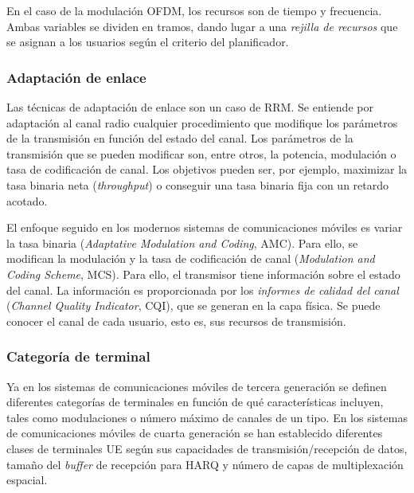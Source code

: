 \documentclass[12pt]{report} %
\begin{document}
En el caso de la modulación OFDM, los recursos son de tiempo y frecuencia.
Ambas variables se dividen en tramos, dando lugar a una \textit{rejilla de recursos} que se asignan a los usuarios según el criterio del planificador.
\cite{RefWorks:26, RefWorks:80}

%

\subsubsection{Adaptación de enlace}

Las técnicas de adaptación de enlace son un caso de RRM.
Se entiende por adaptación al canal radio cualquier procedimiento que modifique los parámetros de la transmisión en función del estado del canal.
Los parámetros de la transmisión que se pueden modificar son, entre otros, la potencia, modulación o tasa de codificación de canal.
Los objetivos pueden ser, por ejemplo, maximizar la tasa binaria neta (\textit{throughput}) o conseguir una tasa binaria fija con un retardo acotado.
\cite{RefWorks:80}

El enfoque seguido en los modernos sistemas de comunicaciones móviles es variar la tasa binaria (\textit{Adaptative Modulation and Coding}, AMC).
Para ello, se modifican la modulación y la tasa de codificación de canal (\textit{Modulation and Coding Scheme}, MCS).
Para ello, el transmisor tiene información sobre el estado del canal.
La información es proporcionada por los \textit{informes de calidad del canal} (\textit{Channel Quality Indicator}, CQI), que se generan en la capa física.
Se puede conocer el canal de cada usuario, esto es, sus recursos de transmisión.
\cite{RefWorks:26, RefWorks:80}

\subsubsection{Categoría de terminal}

Ya en los sistemas de comunicaciones móviles de tercera generación se definen diferentes categorías de terminales en función de qué características incluyen,
tales como modulaciones o número máximo de canales de un tipo.
\cite{RefWorks:92}
En los sistemas de comunicaciones móviles de cuarta generación se han establecido diferentes clases de terminales UE según
sus capacidades de transmisión/recepción de datos,
tamaño del \textit{buffer} de recepción para HARQ
y número de capas de multiplexación espacial.
\cite{RefWorks:81}
\end{document}
